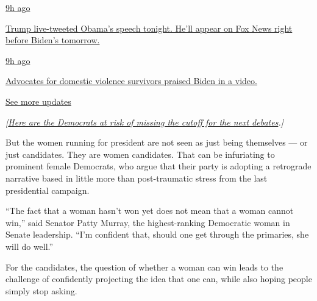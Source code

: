 \href{https://www.nytimes3xbfgragh.onion/live/2020/08/19/us/dnc-convention-election?action=click\&pgtype=Article\&state=default\&region=MAIN_CONTENT_1\&context=storylines_live_updates\#trump-live-tweeted-obamas-speech-tonight-hell-appear-on-fox-news-right-before-bidens-tomorrow}{9h
ago}

\href{https://www.nytimes3xbfgragh.onion/live/2020/08/19/us/dnc-convention-election?action=click\&pgtype=Article\&state=default\&region=MAIN_CONTENT_1\&context=storylines_live_updates\#trump-live-tweeted-obamas-speech-tonight-hell-appear-on-fox-news-right-before-bidens-tomorrow}{Trump
live-tweeted Obama's speech tonight. He'll appear on Fox News right
before Biden's tomorrow.}

\href{https://www.nytimes3xbfgragh.onion/live/2020/08/19/us/dnc-convention-election?action=click\&pgtype=Article\&state=default\&region=MAIN_CONTENT_1\&context=storylines_live_updates\#advocates-for-domestic-violence-survivors-praised-biden-in-a-video}{9h
ago}

\href{https://www.nytimes3xbfgragh.onion/live/2020/08/19/us/dnc-convention-election?action=click\&pgtype=Article\&state=default\&region=MAIN_CONTENT_1\&context=storylines_live_updates\#advocates-for-domestic-violence-survivors-praised-biden-in-a-video}{Advocates
for domestic violence survivors praised Biden in a video.}

\href{https://www.nytimes3xbfgragh.onion/live/2020/08/19/us/dnc-convention-election?action=click\&pgtype=Article\&state=default\&region=MAIN_CONTENT_1\&context=storylines_live_updates}{See
more updates}

\emph{{[}}\href{https://www.nytimes3xbfgragh.onion/2019/07/03/us/politics/july-democratic-debate-participants.html}{\emph{Here
are the Democrats at risk of missing the cutoff for the next
debates}}\emph{.{]}}

But the women running for president are not seen as just being
themselves --- or just candidates. They are women candidates. That can
be infuriating to prominent female Democrats, who argue that their party
is adopting a retrograde narrative based in little more than
post-traumatic stress from the last presidential campaign.

``The fact that a woman hasn't won yet does not mean that a woman cannot
win,'' said Senator Patty Murray, the highest-ranking Democratic woman
in Senate leadership. ``I'm confident that, should one get through the
primaries, she will do well.''

For the candidates, the question of whether a woman can win leads to the
challenge of confidently projecting the idea that one can, while also
hoping people simply stop asking.

